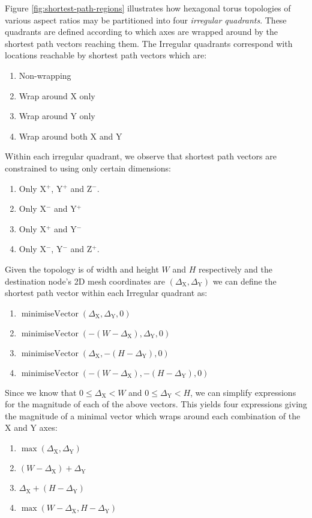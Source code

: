 			Figure \ref{fig:shortest-path-regions} illustrates how hexagonal torus
			topologies of various aspect ratios may be partitioned into four
			\emph{irregular quadrants}. These quadrants are defined according to which
			axes are wrapped around by the shortest path vectors reaching them. The
			Irregular quadrants correspond with locations reachable by shortest path
			vectors which are:
			\begin{enumerate}
				\item Non-wrapping
				\item Wrap around X only
				\item Wrap around Y only
				\item Wrap around both X and Y
			\end{enumerate}
			Within each irregular quadrant, we observe that shortest path vectors are
			constrained to using only certain dimensions:
			\begin{enumerate}
				\item Only X$^+$, Y$^+$ and Z$^-$.
				\item Only X$^-$ and Y$^+$
				\item Only X$^+$ and Y$^-$
				\item Only X$^-$, Y$^-$ and Z$^+$.
			\end{enumerate}
			Given the topology is of width and height $W$ and $H$ respectively and the
			destination node's 2D mesh coordinates are $(\Delta_\textrm{X},
			\Delta_\textrm{Y})$ we can define the shortest path vector within each
			Irregular quadrant as:
			\begin{enumerate}
				\item $\operatorname{minimiseVector}(\Delta_\textrm{X},\Delta_\textrm{Y},0)$
				\item $\operatorname{minimiseVector}(-(W-\Delta_\textrm{X}),\Delta_\textrm{Y},0)$
				\item $\operatorname{minimiseVector}(\Delta_\textrm{X},-(H-\Delta_\textrm{Y}),0)$
				\item $\operatorname{minimiseVector}(-(W-\Delta_\textrm{X}),-(H-\Delta_\textrm{Y}),0)$
			\end{enumerate}
			Since we know that $0 \le \Delta_\textrm{X} < W$ and $0 \le
			\Delta_\textrm{Y} < H$, we can simplify expressions for the magnitude of
			each of the above vectors. This yields four expressions giving the
			magnitude of a minimal vector which wraps around each combination of the
			X and Y axes:
			\begin{enumerate}
				\item $\operatorname{max}(\Delta_\textrm{X}, \Delta_\textrm{Y})$
				\item $(W - \Delta_\textrm{X}) + \Delta_\textrm{Y}$
				\item $\Delta_\textrm{X} + (H - \Delta_\textrm{Y})$
				\item $\operatorname{max}(W-\Delta_\textrm{X}, H-\Delta_\textrm{Y})$
			\end{enumerate}
